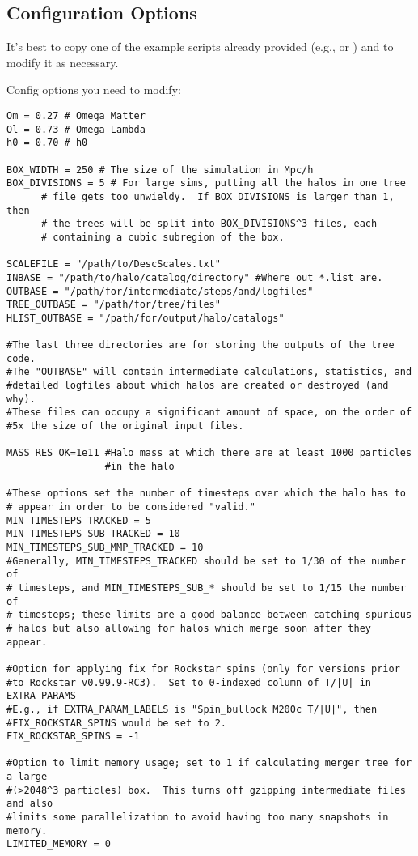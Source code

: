 \documentclass[12pt]{article}
\begin{document}
  \subsection{Configuration Options}
      It's best to copy one of the example scripts already provided 
      (e.g.,  or ) and to modify it as necessary.

      Config options you need to modify:
\begin{verbatim}
Om = 0.27 # Omega Matter
Ol = 0.73 # Omega Lambda
h0 = 0.70 # h0

BOX_WIDTH = 250 # The size of the simulation in Mpc/h
BOX_DIVISIONS = 5 # For large sims, putting all the halos in one tree
      # file gets too unwieldy.  If BOX_DIVISIONS is larger than 1, then
      # the trees will be split into BOX_DIVISIONS^3 files, each
      # containing a cubic subregion of the box.

SCALEFILE = "/path/to/DescScales.txt"
INBASE = "/path/to/halo/catalog/directory" #Where out_*.list are. 
OUTBASE = "/path/for/intermediate/steps/and/logfiles"
TREE_OUTBASE = "/path/for/tree/files"
HLIST_OUTBASE = "/path/for/output/halo/catalogs"

#The last three directories are for storing the outputs of the tree code.
#The "OUTBASE" will contain intermediate calculations, statistics, and
#detailed logfiles about which halos are created or destroyed (and why).
#These files can occupy a significant amount of space, on the order of
#5x the size of the original input files.

MASS_RES_OK=1e11 #Halo mass at which there are at least 1000 particles
                 #in the halo

#These options set the number of timesteps over which the halo has to
# appear in order to be considered "valid."    
MIN_TIMESTEPS_TRACKED = 5
MIN_TIMESTEPS_SUB_TRACKED = 10
MIN_TIMESTEPS_SUB_MMP_TRACKED = 10
#Generally, MIN_TIMESTEPS_TRACKED should be set to 1/30 of the number of
# timesteps, and MIN_TIMESTEPS_SUB_* should be set to 1/15 the number of
# timesteps; these limits are a good balance between catching spurious
# halos but also allowing for halos which merge soon after they appear.

#Option for applying fix for Rockstar spins (only for versions prior
#to Rockstar v0.99.9-RC3).  Set to 0-indexed column of T/|U| in EXTRA_PARAMS
#E.g., if EXTRA_PARAM_LABELS is "Spin_bullock M200c T/|U|", then
#FIX_ROCKSTAR_SPINS would be set to 2.
FIX_ROCKSTAR_SPINS = -1

#Option to limit memory usage; set to 1 if calculating merger tree for a large
#(>2048^3 particles) box.  This turns off gzipping intermediate files and also
#limits some parallelization to avoid having too many snapshots in memory.
LIMITED_MEMORY = 0
\end{verbatim}
\end{document}
